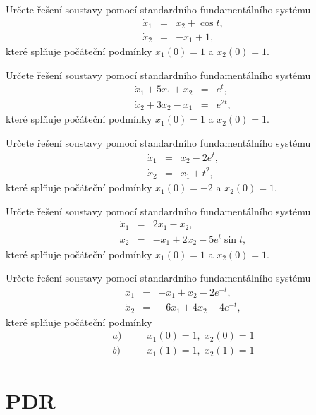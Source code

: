 \documentclass[a4paper,10pt]{book}
\begin{document}
\exercise \label{ex:ode3} Určete řešení soustavy pomocí standardního fundamentálního systému
\begin{eqnarray*}
\dot{x}_1 &=& x_2  + \cos t, \\
\dot{x}_2 &=& -x_1 + 1, 
\end{eqnarray*}
které splňuje počáteční podmínky $x_1(0)=1$ a $x_2(0)=1$.

\exercise \label{ex:ode4} Určete řešení soustavy pomocí standardního fundamentálního systému
\begin{eqnarray*}
\dot{x}_1 + 5x_1 + x_2 &=& e^t  ,\\
\dot{x}_2 + 3x_2 - x_1 &=& e^{2t} ,
\end{eqnarray*}
které splňuje počáteční podmínky $x_1(0)=1$ a $x_2(0)=1$.

\exercise \label{ex:ode5} Určete řešení soustavy pomocí standardního fundamentálního systému
\begin{eqnarray*}
\dot{x}_1 &=& x_2 - 2e^t ,\\
\dot{x}_2 &=& x_1 + t^2  ,
\end{eqnarray*}
které splňuje počáteční podmínky $x_1(0)=-2$ a $x_2(0)=1$.

\exercise \label{ex:ode6} Určete řešení soustavy pomocí standardního fundamentálního systému
\begin{eqnarray*}
\dot{x}_1 &=& 2x_1 - x_2 ,\\
\dot{x}_2 &=& -x_1 + 2x_2 - 5e^t \sin t ,
\end{eqnarray*}
které splňuje počáteční podmínky $x_1(0)=1$ a $x_2(0)=1$.

\exercise \label{ex:ode7} Určete řešení soustavy pomocí standardního fundamentálního systému
\begin{eqnarray*}
\dot{x}_1 &=& -x_1 + x_2 -2e^{-t},\\
\dot{x}_2 &=& -6x_1 + 4x_2 - 4e^{-t},
\end{eqnarray*}
které splňuje počáteční podmínky 
\begin{eqnarray*}
  a)&\quad& x_1(0)=1,\; x_2(0)=1 \\
  b)&\quad& x_1(1)=1,\; x_2(1)=1 
\end{eqnarray*}




\chapter{PDR}
\end{document}
